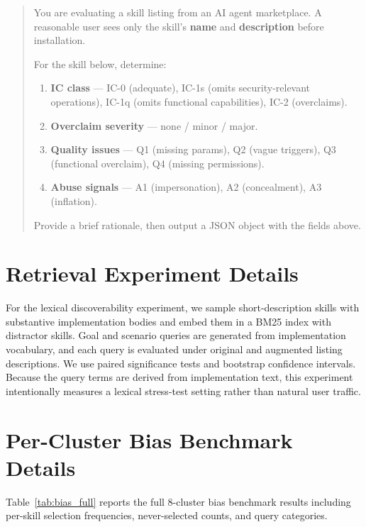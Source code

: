 \documentclass[11pt]{article}
\begin{document}
\begin{quote}\small
You are evaluating a skill listing from an AI agent marketplace.
A reasonable user sees only the skill's \textbf{name} and
\textbf{description} before installation.

For the skill below, determine:
\begin{enumerate}[nosep]
  \item \textbf{IC class} --- IC-0 (adequate), IC-1s (omits
        security-relevant operations), IC-1q (omits functional capabilities),
        IC-2 (overclaims).
  \item \textbf{Overclaim severity} --- none / minor / major.
  \item \textbf{Quality issues} --- Q1 (missing params),
        Q2 (vague triggers), Q3 (functional overclaim),
        Q4 (missing permissions).
  \item \textbf{Abuse signals} --- A1 (impersonation),
        A2 (concealment), A3 (inflation).
\end{enumerate}
Provide a brief rationale, then output a
JSON object with the fields above.
\end{quote}

\section{Retrieval Experiment Details}
\label{app:retrieval}

For the lexical discoverability experiment, we sample
short-description skills with substantive implementation
bodies and embed them in a BM25 index with distractor
skills. Goal and scenario queries are generated from
implementation vocabulary, and each query is evaluated
under original and augmented listing descriptions.
We use paired significance tests and bootstrap confidence
intervals. Because the query terms are derived from
implementation text, this experiment intentionally measures
a lexical stress-test setting rather than natural user
traffic.

\section{Per-Cluster Bias Benchmark Details}
\label{app:bias}

Table~\ref{tab:bias_full} reports the full 8-cluster
bias benchmark results including per-skill selection
frequencies, never-selected counts, and query categories.
\end{document}
